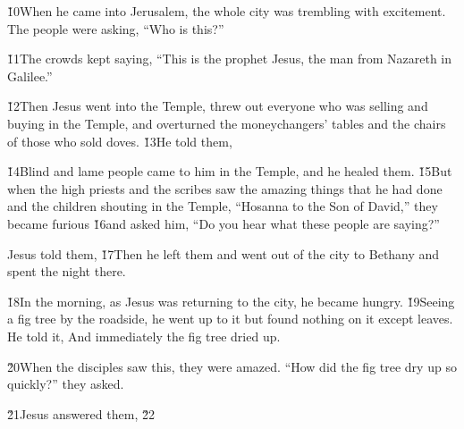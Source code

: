 \v{10}When he came into Jerusalem, the whole city was trembling with excitement. The people were asking, ``Who is this?''

\v{11}The crowds kept saying, ``This is the prophet Jesus, the man from Nazareth in Galilee.''

\v{12}Then Jesus went into the Temple, threw out everyone who was selling and buying in the Temple, and overturned the moneychangers' tables and the chairs of those who sold doves. \v{13}He told them, 

\v{14}Blind and lame people came to him in the Temple, and he healed them. \v{15}But when the high priests and the scribes saw the amazing things that he had done and the children shouting in the Temple, ``Hosanna to the Son of David,'' they became furious \v{16}and asked him, ``Do you hear what these people are saying?''

Jesus told them,  \v{17}Then he left them and went out of the city to Bethany and spent the night there.

\v{18}In the morning, as Jesus was returning to the city, he became hungry. \v{19}Seeing a fig tree by the roadside, he went up to it but found nothing on it except leaves. He told it,  And immediately the fig tree dried up.

\v{20}When the disciples saw this, they were amazed. ``How did the fig tree dry up so quickly?'' they asked.

\v{21}Jesus answered them,  \v{22}

